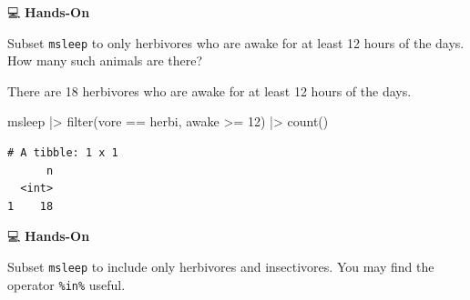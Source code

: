 \documentclass[
  letterpaper,
  DIV=11,
  numbers=noendperiod]{scrreprt}
\newenvironment{Shaded}{\begin{snugshade}}{\end{snugshade}}
\newcommand{\DecValTok}[1]{\textcolor[rgb]{0.68,0.00,0.00}{#1}}
\newcommand{\FunctionTok}[1]{\textcolor[rgb]{0.28,0.35,0.67}{#1}}
\newcommand{\NormalTok}[1]{\textcolor[rgb]{0.00,0.23,0.31}{#1}}
\newcommand{\SpecialCharTok}[1]{\textcolor[rgb]{0.37,0.37,0.37}{#1}}
\newcommand{\StringTok}[1]{\textcolor[rgb]{0.13,0.47,0.30}{#1}}
\begin{document}
💻 \textbf{Hands-On}

Subset \texttt{msleep} to only herbivores who are awake for at least 12
hours of the days. How many such animals are there?

\begin{tcolorbox}[enhanced jigsaw, colbacktitle=quarto-callout-tip-color!10!white, opacitybacktitle=0.6, breakable, left=2mm, leftrule=.75mm, toprule=.15mm, toptitle=1mm, bottomtitle=1mm, colframe=quarto-callout-tip-color-frame, opacityback=0, coltitle=black, arc=.35mm, titlerule=0mm, colback=white, bottomrule=.15mm, title=\textcolor{quarto-callout-tip-color}{\faLightbulb}\hspace{0.5em}{Answer}, rightrule=.15mm]

There are 18 herbivores who are awake for at least 12 hours of the days.

\begin{Shaded}
\begin{Highlighting}[]
\NormalTok{msleep }\SpecialCharTok{|\textgreater{}}
  \FunctionTok{filter}\NormalTok{(vore }\SpecialCharTok{==} \StringTok{\textquotesingle{}herbi\textquotesingle{}}\NormalTok{, awake }\SpecialCharTok{\textgreater{}=} \DecValTok{12}\NormalTok{) }\SpecialCharTok{|\textgreater{}}
  \FunctionTok{count}\NormalTok{()}
\end{Highlighting}
\end{Shaded}

\begin{verbatim}
# A tibble: 1 x 1
      n
  <int>
1    18
\end{verbatim}

\end{tcolorbox}

💻 \textbf{Hands-On}

Subset \texttt{msleep} to include only herbivores and insectivores. You
may find the operator \texttt{\%in\%} useful.
\end{document}
